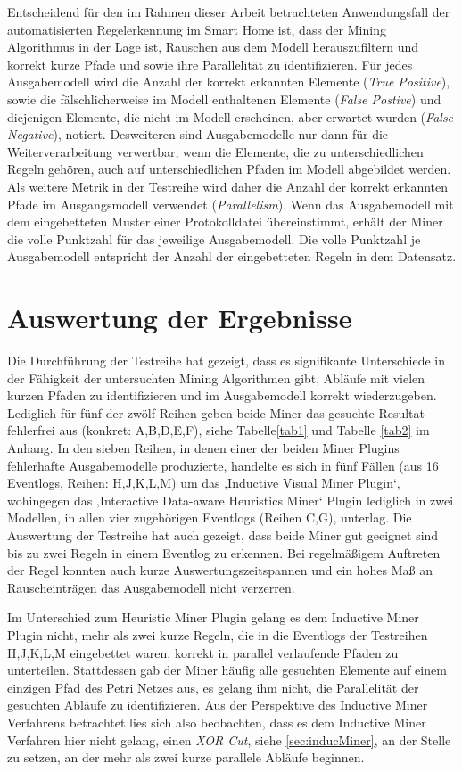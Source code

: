 Entscheidend für den im Rahmen dieser Arbeit betrachteten Anwendungsfall der automatisierten Regelerkennung im Smart Home ist, dass der Mining Algorithmus in der Lage ist, Rauschen aus dem Modell herauszufiltern und korrekt kurze Pfade und sowie ihre Parallelität zu identifizieren. Für jedes Ausgabemodell wird die Anzahl der korrekt erkannten Elemente (\textit{True Positive}), sowie die fälschlicherweise im Modell enthaltenen Elemente (\textit{False Postive}) und diejenigen Elemente, die nicht im Modell erscheinen, aber erwartet wurden (\textit{False Negative}), notiert. 
Desweiteren sind Ausgabemodelle nur dann für die Weiterverarbeitung verwertbar, wenn die Elemente, die zu unterschiedlichen Regeln gehören, auch auf unterschiedlichen Pfaden im Modell abgebildet werden. Als weitere Metrik in der Testreihe wird daher die Anzahl der korrekt erkannten Pfade im Ausgangsmodell verwendet (\textit{Parallelism}). Wenn das Ausgabemodell mit dem eingebetteten Muster einer Protokolldatei übereinstimmt, erhält der Miner die volle Punktzahl für das jeweilige Ausgabemodell. Die volle Punktzahl je Ausgabemodell entspricht der Anzahl der eingebetteten Regeln in dem Datensatz.

\section{Auswertung der Ergebnisse}\label{sec:res}
Die Durchführung der Testreihe hat gezeigt, dass es signifikante Unterschiede in der Fähigkeit der untersuchten Mining Algorithmen gibt, Abläufe mit vielen kurzen Pfaden zu identifizieren und im Ausgabemodell korrekt wiederzugeben. Lediglich für fünf der zwölf Reihen geben beide Miner das gesuchte Resultat fehlerfrei aus (konkret: A,B,D,E,F), siehe Tabelle\ref{tab1} und Tabelle \ref{tab2} im Anhang. In den sieben Reihen, in denen einer der beiden Miner Plugins fehlerhafte Ausgabemodelle produzierte, handelte es sich in fünf Fällen (aus 16 Eventlogs, Reihen: H,J,K,L,M) um das ‚Inductive Visual Miner Plugin‘, wohingegen das ‚Interactive Data-aware Heuristics Miner‘ Plugin lediglich in zwei Modellen, in allen vier zugehörigen Eventlogs (Reihen C,G), unterlag. Die Auswertung der Testreihe hat auch gezeigt, dass beide Miner gut geeignet sind bis zu zwei Regeln in einem Eventlog zu erkennen. Bei regelmäßigem Auftreten der Regel konnten auch kurze Auswertungszeitspannen und ein hohes Maß an Rauscheinträgen das Ausgabemodell nicht verzerren.

Im Unterschied zum Heuristic Miner Plugin gelang es dem Inductive Miner Plugin nicht, mehr als zwei kurze Regeln, die in die Eventlogs der Testreihen H,J,K,L,M eingebettet waren, korrekt in parallel verlaufende Pfaden zu unterteilen. Stattdessen gab der Miner häufig alle gesuchten Elemente auf einem einzigen Pfad des Petri Netzes aus, es gelang ihm nicht, die Parallelität der gesuchten Abläufe zu identifizieren. 
Aus der Perspektive des Inductive Miner Verfahrens betrachtet lies sich also beobachten, dass es dem Inductive Miner Verfahren hier nicht gelang, einen \textit{XOR Cut}, siehe \ref{sec:inducMiner}, an der Stelle zu setzen, an der mehr als zwei kurze parallele Abläufe beginnen. 

